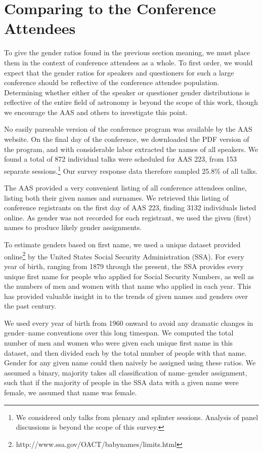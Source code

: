 \documentclass[iop]{emulateapj}
\begin{document}
\section{Comparing to the Conference Attendees} 
To give the gender ratios found in the previous section meaning, we must place them in the context of conference attendees as a whole. To first order, we would expect that the gender ratios for speakers and questioners for such a large conference should be reflective of the conference attendee population. Determining whether either of the speaker or questioner gender distributions is reflective of the entire field of astronomy is beyond the scope of this work, though we encourage the AAS and others to investigate this point.


No easily parseable version of the conference program was available by the AAS website. 
On the final day of the conference, we downloaded the PDF version of the program, and with considerable labor extracted the names of all speakers. We found a total of 872 individual talks were scheduled for AAS 223, from 153 separate sessions.\footnote{We considered only talks from plenary and splinter sessions. Analysis of panel discussions is beyond the scope of this survey.} Our survey response data therefore sampled 25.8\% of all talks.

The AAS provided a very convenient listing of all conference attendees online, listing both their given names and surnames. We retrieved this listing of conference registrants on the first day of AAS 223, finding 3132 individuals listed online. As gender was not recorded for each registrant, we used the given (first) names to produce likely gender assignments.

To estimate genders based on first name, we used a unique dataset provided online\footnote{http://www.ssa.gov/OACT/babynames/limits.html}  by the United States Social Security Administration (SSA). For every year of birth, ranging from 1879 through the present, the SSA provides every unique first name for people who applied for Social Security Numbers, as well as the numbers of men and women with that name who applied in each year. This has provided valuable insight in to the trends of given names and genders over the past century.


We used every year of birth from 1960 onward to avoid any dramatic changes in gender--name conventions over this long timespan. We computed the total number of men and women who were given each unique first name in this dataset, and then divided each by the total number of people with that name. Gender for any given name could then naively be assigned using these ratios. We assumed a binary, majority takes all classification of name--gender assignment, such that if the majority of people in the SSA data with a given name were female, we assumed that name  was female.
\end{document}
